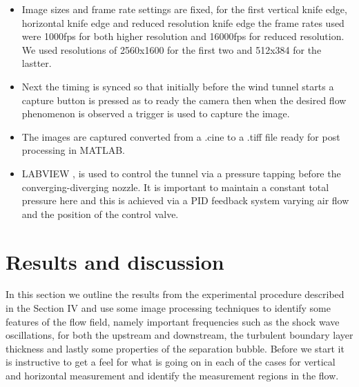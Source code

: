 \documentclass[a4paper,10pt,twoside]{article}
\begin{document}
\begin{multicols}{2}
\begin{itemize}
    
    
    \item Image sizes and frame rate settings are fixed, for the first vertical knife edge, horizontal knife edge and reduced resolution knife edge the frame rates used were 1000fps for both higher resolution and 16000fps for reduced resolution. We used resolutions of 2560x1600 for the first two and 512x384 for the lastter.
    
    
    
    \item Next the timing is synced so that initially before the wind tunnel starts a capture button is pressed as to ready the camera then when the desired flow phenomenon is observed a trigger is used to capture the image.
    
    
    
    \item The images are captured converted from a .cine to a .tiff file ready for post processing in MATLAB.
    
    
    
    \item LABVIEW \cite{9}, is used to control the tunnel via a pressure tapping before the converging-diverging nozzle. It is important to maintain a constant total pressure here and this is achieved via a PID feedback system varying air flow and the position of the control valve.
    
    
    
\end{itemize}










\section{Results and discussion}



In this section we outline the results from the experimental procedure described in the Section IV and use some image processing techniques to identify some features of the flow field, namely important frequencies such as the shock wave oscillations, for both the upstream and downstream, the turbulent boundary layer thickness and lastly some properties of the separation bubble. Before we start it is instructive to get a feel for what is going on in each of the cases for vertical and horizontal measurement and identify the measurement regions in the flow. \par




\end{multicols}
\end{document}
